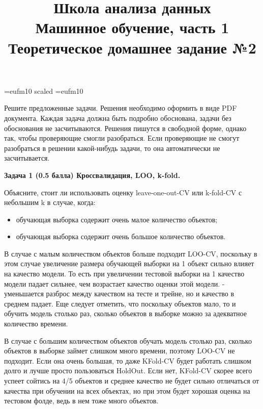 \documentclass[10pt]{article}
\title{Школа анализа данных\\Машинное обучение, часть 1\\Теоретическое домашнее задание №2}
\author{}
\date{}
\begin{document}
\voffset=-20mm
\hoffset=-17mm
\font\Got=eufm10 scaled \font\Got=eufm10


\maketitle

Решите предложенные задачи. Решения необходимо оформить в виде PDF документа. Каждая задача должна быть подробно обоснована, задачи без обоснования не засчитываются. Решения пишутся в свободной форме, однако так, чтобы проверяющие смогли разобраться. Если проверяющие не смогут разобраться в решении какой-нибудь задачи, то она автоматически не засчитывается.


\bigskip

\textbf{Задача 1 (0.5 балла) Кроссвалидация, LOO, k-fold.}

Объясните, стоит ли использовать оценку leave-one-out-CV или k-fold-CV с небольшим k в случае, когда:
	\begin{itemize}
		\item обучающая выборка содержит очень малое количество объектов;
		\item обучающая выборка содержит очень большое количество объектов.
	\end{itemize}

В случае с малым количеством объектов больше подходит LOO-CV, поскольку в этом случае увеличение размера обучающей
выборки на 1 объект сильно влияет на качество модели. То есть при увеличении тестовой выборки на 1 качество модели
падает сильнее, чем возрастает качество оценки этой модели. - уменьшается разброс между качеством на тесте и трейне, но
и качество в среднем падает. Еще следует отметить, что поскольку объектов мало, то и обучить модель столько раз, сколько объектов в выборке можно за адекватное количество времени.

В случае с большим количеством объектов обучать модель столько раз, сколько объектов в выборке займет слишком много времени, поэтому LOO-CV не подходит. Если она очень большая, то даже KFold-CV будет работать слишком долго и лучше просто пользоваться HoldOut. Если нет, KFold-CV скорее всего успеет сойтись на 4/5 объектов и среднее качество не будет сильно отличаться от качества при обучении на всех объектах, но при этом будет хорошая оценка на тестовом фолде, ведь в нем тоже много объектов.

\bigskip
\end{document}
